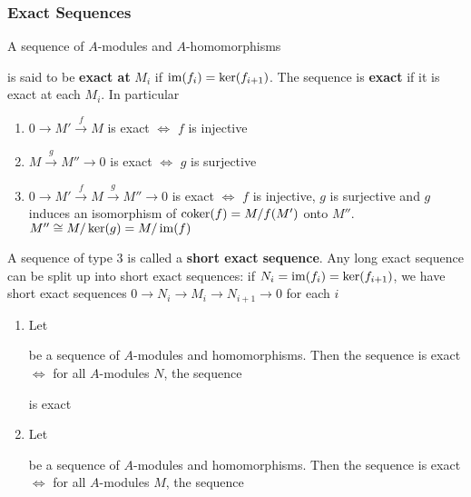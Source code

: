 \documentclass[11pt]{article}
\begin{document}
\subsubsection*{Exact Sequences}
\label{sec:orgc213245}
A sequence of \(A\)-modules and \(A\)-homomorphisms
\begin{center}\end{center}
is said to be \textbf{exact at} \(M_i\) if \(\operatorname{im}(f_i)=\ker(f_{i+1})\). The sequence is \textbf{exact} if it is exact
at each \(M_i\). In particular
\begin{enumerate}
\item \(0\to M'\xrightarrow{f}M\) is exact \(\Leftrightarrow\) \(f\) is injective
\item \(M\xrightarrow{g}M''\to 0\) is exact \(\Leftrightarrow\) \(g\) is surjective
\item \(0\to M'\xrightarrow{f}M\xrightarrow{g}M''\to 0\) is exact \(\Leftrightarrow\) \(f\) is injective, \(g\) is surjective and \(g\)
induces an isomorphism of \(\operatorname{coker}(f)=M/f(M')\) onto \(M''\).
\(M''\cong M/\ker(g)=M/\operatorname{im}(f)\)
\end{enumerate}


A sequence of type 3 is called a \textbf{short exact sequence}. Any long exact sequence can be split up
into short exact sequences: if \(N_i=\operatorname{im}(f_i)=\ker(f_{i+1})\), we have short exact
sequences \(0\to N_i\to M_i\to N_{i+1}\to 0\) for each \(i\)

\begin{proposition}[]
\begin{enumerate}
\item Let
\begin{center}\end{center}
be a sequence of \(A\)-modules and homomorphisms. Then the sequence is exact \(\Leftrightarrow\) for
all \(A\)-modules \(N\), the sequence
\begin{center}\end{center}
is exact
\item Let
\begin{center}\end{center}
be a sequence of \(A\)-modules and homomorphisms. Then the sequence is exact \(\Leftrightarrow\) for
all \(A\)-modules \(M\), the sequence
\begin{center}\end{center}
\end{enumerate}
\end{proposition}
\end{document}
